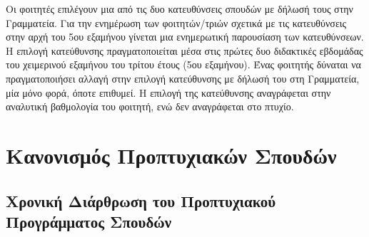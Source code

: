 Οι φοιτητές επιλέγουν μια από τις δυο κατευθύνσεις σπουδών με δήλωσή
τους στην Γραμματεία. Για την ενημέρωση των φοιτητών/τριών σχετικά με
τις κατευθύνσεις στην αρχή του 5ου εξαμήνου γίνεται μια ενημερωτική
παρουσίαση των κατευθύνσεων. Η επιλογή κατεύθυνσης πραγματοποιείται μέσα
στις πρώτες δυο διδακτικές εβδομάδας του χειμερινού εξαμήνου του τρίτου
έτους (5ου εξαμήνου). Ένας φοιτητής δύναται να πραγματοποιήσει αλλαγή
στην επιλογή κατεύθυνσης με δήλωσή του στη Γραμματεία, μία μόνο φορά,
όποτε επιθυμεί. Η επιλογή της κατεύθυνσης αναγράφεται στην αναλυτική
βαθμολογία του φοιτητή, ενώ δεν αναγράφεται στο πτυχίο.

\hypertarget{ux3baux3b1ux3bdux3bfux3bdux3b9ux3c3ux3bcux3ccux3c2-ux3c0ux3c1ux3bfux3c0ux3c4ux3c5ux3c7ux3b9ux3b1ux3baux3ceux3bd-ux3c3ux3c0ux3bfux3c5ux3b4ux3ceux3bd}{%
\section{Κανονισμός Προπτυχιακών
Σπουδών}\label{ux3baux3b1ux3bdux3bfux3bdux3b9ux3c3ux3bcux3ccux3c2-ux3c0ux3c1ux3bfux3c0ux3c4ux3c5ux3c7ux3b9ux3b1ux3baux3ceux3bd-ux3c3ux3c0ux3bfux3c5ux3b4ux3ceux3bd}}

\hypertarget{ux3c7ux3c1ux3bfux3bdux3b9ux3baux3ae-ux3b4ux3b9ux3acux3c1ux3b8ux3c1ux3c9ux3c3ux3b7-ux3c4ux3bfux3c5-ux3c0ux3c1ux3bfux3c0ux3c4ux3c5ux3c7ux3b9ux3b1ux3baux3bfux3cd-ux3c0ux3c1ux3bfux3b3ux3c1ux3acux3bcux3bcux3b1ux3c4ux3bfux3c2-ux3c3ux3c0ux3bfux3c5ux3b4ux3ceux3bd}{%
\subsection{Χρονική Διάρθρωση του Προπτυχιακού Προγράμματος
Σπουδών}\label{ux3c7ux3c1ux3bfux3bdux3b9ux3baux3ae-ux3b4ux3b9ux3acux3c1ux3b8ux3c1ux3c9ux3c3ux3b7-ux3c4ux3bfux3c5-ux3c0ux3c1ux3bfux3c0ux3c4ux3c5ux3c7ux3b9ux3b1ux3baux3bfux3cd-ux3c0ux3c1ux3bfux3b3ux3c1ux3acux3bcux3bcux3b1ux3c4ux3bfux3c2-ux3c3ux3c0ux3bfux3c5ux3b4ux3ceux3bd}}

